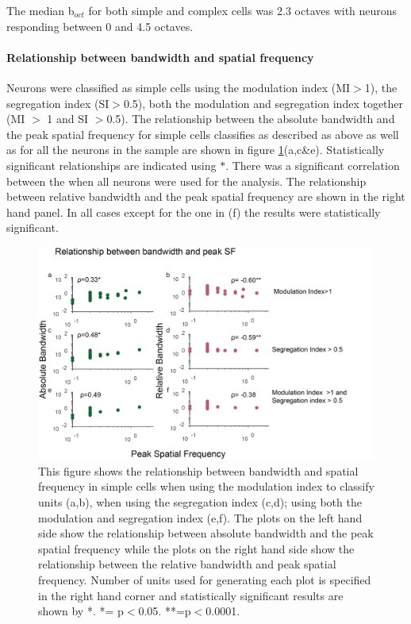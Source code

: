 	The median b$_{oct}$ for both simple and complex cells was 2.3 octaves with neurons responding between 0 and 4.5 octaves. 
	\paragraph{Relationship between bandwidth and spatial frequency}
	
	Neurons were classified as simple cells using the modulation index (MI$>$1), the segregation index (SI$>$0.5), both the modulation and segregation index together (MI $>$ 1 and SI $>$0.5). The relationship between the absolute bandwidth and the peak spatial frequency for simple cells classifies as described as above as well as for all the neurons in the sample are shown in figure \ref{fig:hwpksf}(a,c\&e). Statistically significant relationships are indicated using $*$. There was a significant correlation between the when all neurons were used for the analysis. The relationship between relative bandwidth and the peak spatial frequency are shown in the right hand panel. In all cases except for the one in (f) the results were statistically significant.
	
		\begin{figure}[H]
		
		\includegraphics[width=\linewidth]{LinearV1/hwpksf2.jpg}
		\caption{This figure shows the relationship between bandwidth and spatial frequency in simple cells when using the modulation index to classify units (a,b), when using the segregation index (c,d); using both the modulation and segregation index (e,f). The plots on the left hand side show the relationship between absolute bandwidth and the peak spatial frequency while the plots on the right hand side show the relationship between the relative bandwidth and peak spatial frequency. Number of units used for generating each plot is specified in the right hand corner and statistically significant results are shown by *. *= p$<$0.05. **=p$<$0.0001.}
		\label{fig:hwpksf}
		\end{figure}
	
